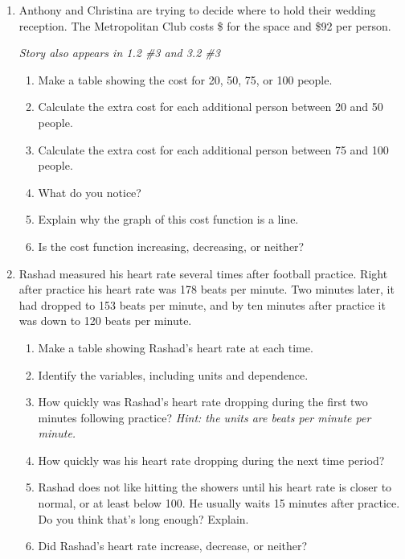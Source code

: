 \begin{enumerate}
\newpage %

 \item Anthony and Christina are trying to decide where to hold their wedding reception.  The Metropolitan Club costs \$ for the space and \$92 per person.  
 
 \hfill \emph{Story also appears in 1.2 \#3 and 3.2 \#3} 
\begin{enumerate}
\item Make a table showing the cost for 20, 50, 75, or 100 people. %
\vfill \vfill
\item Calculate the extra cost for each additional person between 20 and 50 people. \vfill
\item Calculate the extra cost  for each additional person between 75 and 100 people. \vfill
\item What do you notice? \vfill
\item Explain why the graph of this cost function is a line. \vfill
\item Is the cost function increasing, decreasing, or neither? \vfill
\end{enumerate}  

\newpage %

\item Rashad measured his heart rate several times after football practice.  Right after practice his heart rate was 178 beats per minute.  Two minutes later, it had dropped to 153 beats per minute, and by ten minutes after practice it was down to 120 beats per minute. 
\begin{enumerate}
\item Make a table showing Rashad's heart rate at each time. \vfill
\item Identify the variables, including units and dependence. \vfill
\item How quickly was Rashad's heart rate dropping during the first two minutes following practice?  \emph{Hint: the units are beats per minute per minute.} \vfill
\item How quickly was his heart rate dropping during the next time period? \vfill
\item Rashad does not like hitting the showers until  his heart rate is closer to normal, or at least below 100.  He usually waits 15 minutes after practice.  Do you think that's long enough?  Explain. \vfill
 \item Did Rashad's heart rate increase, decrease, or neither? \vfill
\end{enumerate} 
\newpage %


\end{enumerate}
